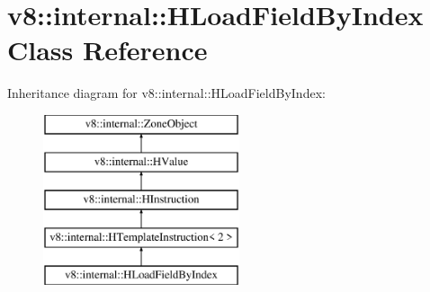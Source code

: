 \hypertarget{classv8_1_1internal_1_1_h_load_field_by_index}{}\section{v8\+:\+:internal\+:\+:H\+Load\+Field\+By\+Index Class Reference}
\label{classv8_1_1internal_1_1_h_load_field_by_index}
Inheritance diagram for v8\+:\+:internal\+:\+:H\+Load\+Field\+By\+Index\+:\begin{figure}[H]
\begin{center}
\leavevmode
\includegraphics[height=5.000000cm]{classv8_1_1internal_1_1_h_load_field_by_index}
\end{center}
\end{figure}
